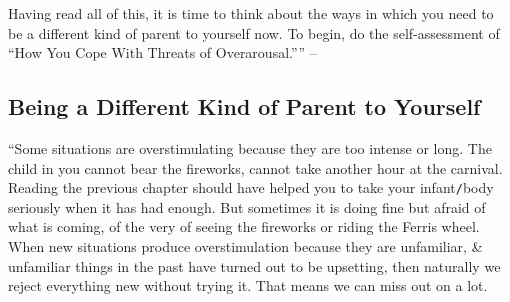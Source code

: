 \documentclass{article}
\numberwithin{equation}{section}
\begin{document}
Having read all of this, it is time to think about the ways in which you need to be a different kind of parent to yourself now. To begin, do the self-assessment of ``How You Cope With Threats of Overarousal.'''' -- \cite[p. 109]{Aron2013}

\subsection{Being a Different Kind of Parent to Yourself}
``Some situations are overstimulating because they are too intense or long. The child in you cannot bear the fireworks, cannot take another hour at the carnival. Reading the previous chapter should have helped you to take your infant{\tt/}body seriously when it has had enough. But sometimes it is doing fine but afraid of what is coming, of the very of seeing the fireworks or riding the Ferris wheel. When new situations produce overstimulation because they are unfamiliar, \& unfamiliar things in the past have turned out to be upsetting, then naturally we reject everything new without trying it. That means we can miss out on a lot.
\end{document}

